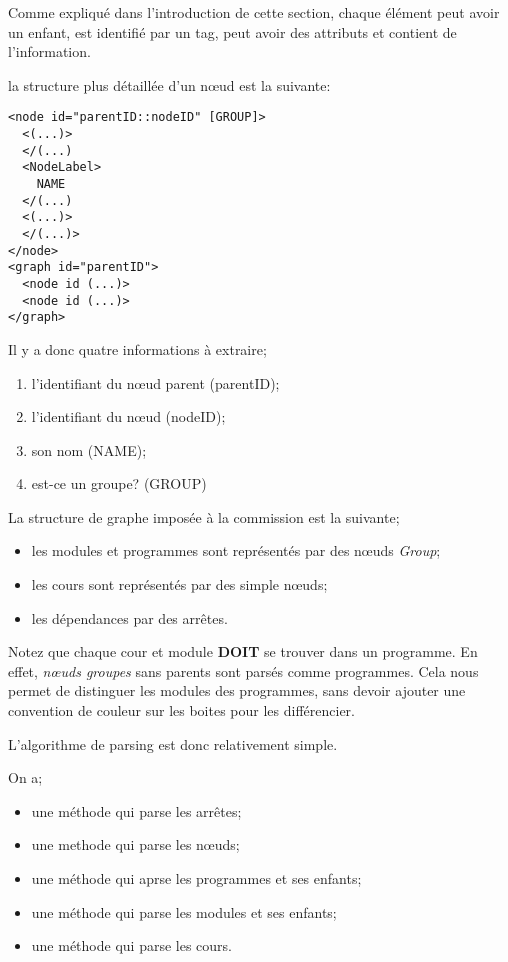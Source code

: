  Comme expliqué dans l'introduction de cette section, chaque élément peut avoir un enfant, est identifié par un tag, peut avoir des attributs et contient de l'information. 

 la structure plus détaillée d'un nœud est la suivante:

\begin{lstlisting}
<node id="parentID::nodeID" [GROUP]>
  <(...)>
  </(...)
  <NodeLabel>
    NAME
  </(...)
  <(...)>
  </(...)>
</node>
<graph id="parentID">
  <node id (...)>
  <node id (...)>
</graph>
\end{lstlisting}

Il y a donc quatre informations à extraire;
\begin{enumerate}
  \item l'identifiant du nœud parent (parentID);
  \item l'identifiant du nœud (nodeID);
  \item son nom (NAME);
  \item est-ce un groupe? (GROUP)
\end{enumerate}

La structure de graphe imposée à la commission est la suivante; 

\begin{itemize}
\item les modules et programmes sont représentés par des nœuds \textit{Group};
\item les cours sont représentés par des simple nœuds;
\item les dépendances par des arrêtes.
\end{itemize}

Notez que chaque cour et module \textbf{DOIT} se trouver dans un programme. En effet, \textit{nœuds groupes} sans parents sont parsés comme programmes. Cela nous permet de distinguer les modules des programmes, sans devoir ajouter une convention de couleur sur les boites pour les différencier.  

L'algorithme de parsing est donc relativement simple.

On a;
\begin{itemize}
  \item une méthode qui parse les arrêtes; 
  \item une methode qui parse les nœuds;
  \item une méthode qui aprse les programmes et ses enfants;
  \item une méthode qui parse les modules et ses enfants;
  \item une méthode qui parse les cours.
\end{itemize}

